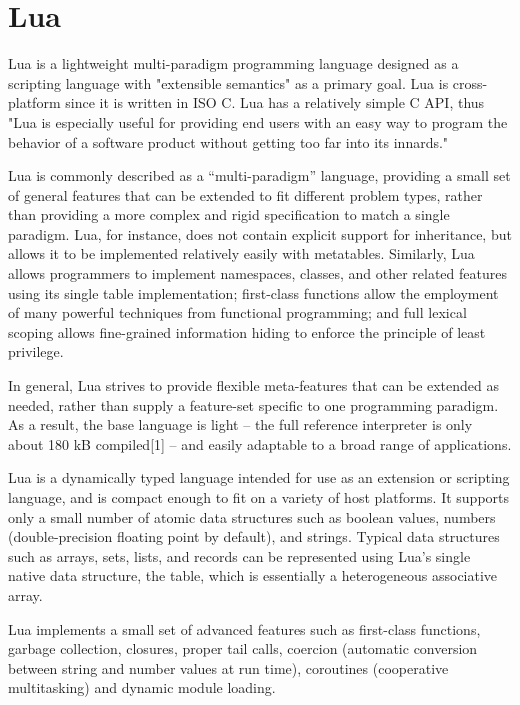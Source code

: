 \newpage
\section{Lua}

Lua is a lightweight multi-paradigm programming language designed as a scripting language with "extensible semantics" as a primary goal. Lua is cross-platform since it is written in ISO C. Lua has a relatively simple C API, thus "Lua is especially useful for providing end users with an easy way to program the behavior of a software product without getting too far into its innards."

\vpara
Lua is commonly described as a “multi-paradigm” language, providing a small set of general features that can be extended to fit different problem types, rather than providing a more complex and rigid specification to match a single paradigm. Lua, for instance, does not contain explicit support for inheritance, but allows it to be implemented relatively easily with metatables. Similarly, Lua allows programmers to implement namespaces, classes, and other related features using its single table implementation; first-class functions allow the employment of many powerful techniques from functional programming; and full lexical scoping allows fine-grained information hiding to enforce the principle of least privilege.

\vpara
In general, Lua strives to provide flexible meta-features that can be extended as needed, rather than supply a feature-set specific to one programming paradigm. As a result, the base language is light – the full reference interpreter is only about 180 kB compiled[1] – and easily adaptable to a broad range of applications.

\vpara
Lua is a dynamically typed language intended for use as an extension or scripting language, and is compact enough to fit on a variety of host platforms. It supports only a small number of atomic data structures such as boolean values, numbers (double-precision floating point by default), and strings. Typical data structures such as arrays, sets, lists, and records can be represented using Lua’s single native data structure, the table, which is essentially a heterogeneous associative array.

\vpara
Lua implements a small set of advanced features such as first-class functions, garbage collection, closures, proper tail calls, coercion (automatic conversion between string and number values at run time), coroutines (cooperative multitasking) and dynamic module loading.

